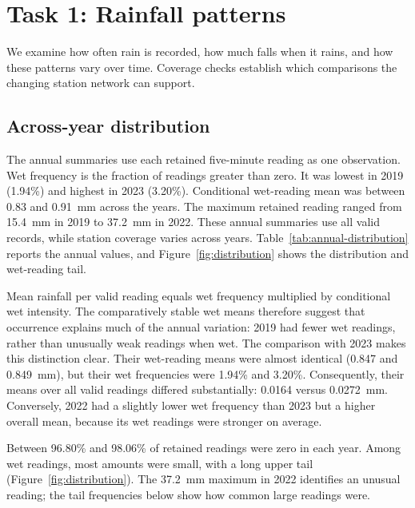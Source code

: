 \documentclass[11pt,a4paper]{article}
\begin{document}
\section{Task 1: Rainfall patterns}
We examine how often rain is recorded, how much falls when it rains, and how
these patterns vary over time. Coverage checks establish which comparisons
the changing station network can support.

\subsection{Across-year distribution}
The annual summaries use each retained five-minute reading as one observation.
Wet frequency is the fraction of readings greater than zero. It was lowest in
2019 (1.94\%) and highest in 2023 (3.20\%). Conditional wet-reading mean was
between 0.83 and 0.91~mm across the years. The maximum retained reading ranged
from 15.4~mm in 2019 to 37.2~mm in 2022. These annual summaries use all valid
records, while station coverage varies across years.
Table~\ref{tab:annual-distribution} reports the annual values, and
Figure~\ref{fig:distribution} shows the distribution and wet-reading tail.

Mean rainfall per valid reading equals wet frequency multiplied by conditional
wet intensity. The comparatively stable wet means therefore suggest that
occurrence explains much of the annual variation: 2019 had fewer wet readings,
rather than unusually weak readings when wet. The comparison with 2023 makes
this distinction clear. Their wet-reading means were almost identical
(0.847 and 0.849~mm), but their wet frequencies were 1.94\% and 3.20\%.
Consequently, their means over all valid readings differed substantially:
0.0164 versus 0.0272~mm. Conversely, 2022 had a slightly lower wet frequency
than 2023 but a higher overall mean, because its wet readings were stronger
on average.

Between 96.80\% and 98.06\% of retained readings were zero in each year.
Among wet readings, most amounts were small, with a long upper tail
(Figure~\ref{fig:distribution}). The 37.2~mm maximum in 2022 identifies an
unusual reading; the tail frequencies below show how common large readings
were.
\end{document}

